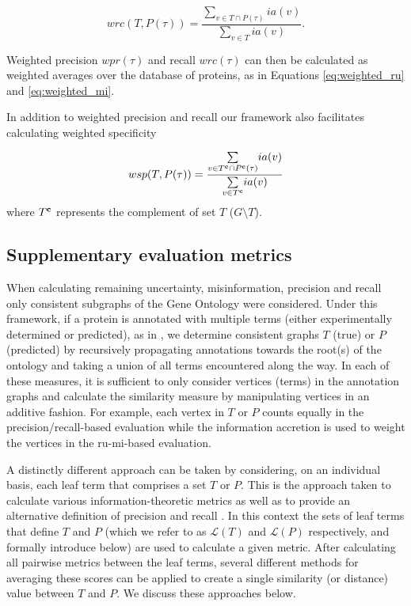 \[
wrc(T,P(\tau))=\frac{\underset{v\in T\cap P(\tau)}{\sum}ia(v)}{\underset{v\in T}{\sum}ia(v)}.
\]


\noindent  Weighted precision $wpr(\tau)$ and recall $wrc(\tau)$ can then be calculated as weighted averages over the database of proteins, as in Equations \ref{eq:weighted_ru} and \ref{eq:weighted_mi}.

In addition to weighted precision and recall our framework also facilitates calculating weighted specificity

\[
wsp(T,P(\tau))=\frac{\underset{v\in T^{\bf{c}} \cap P^{\bf{c}}(\tau)}{\sum}ia(v)}{\underset{v\in T^{\bf{c}}}{\sum}ia(v)}
\]
where $T^{\bf{c}}$ represents the complement of set $T$ ($G \setminus T$).

\subsection{Supplementary evaluation metrics}
\label{sec:rumisupmethods}

When calculating remaining uncertainty, misinformation, precision and recall only consistent subgraphs of the Gene Ontology were considered. Under this framework, if a protein is annotated with multiple terms (either experimentally determined or predicted), as in  , we determine consistent graphs $T$ (true) or $P$ (predicted) by recursively propagating annotations towards the root(s) of the ontology and taking a union of all terms encountered along the way. In each of these measures, it is sufficient to only consider vertices (terms) in the annotation graphs and calculate the similarity measure by manipulating vertices in an additive fashion. For example, each vertex in $T$ or $P$ counts equally in the precision/recall-based evaluation while the information accretion is used to weight the vertices in the ru-mi-based evaluation. 

A distinctly different approach can be taken by considering, on an individual basis, each leaf term that comprises a set $T$ or $P$. This is the approach taken to calculate various information-theoretic metrics \citep{Resnik1995, Jiang1997, Lin1998, Lord2003, Schlicker2006} as well as to provide an alternative definition of precision and recall \citep{Verspoor2006}. In this context the sets of leaf terms that define $T$ and $P$ (which we refer to as $\mathcal{L}(T)$ and $\mathcal{L}(P)$ respectively, and formally introduce below) are used to calculate a given metric. After calculating all pairwise metrics between the leaf terms, several different methods for averaging these scores can be applied to create a single similarity (or distance) value between $T$ and $P$.  We discuss these approaches below.

